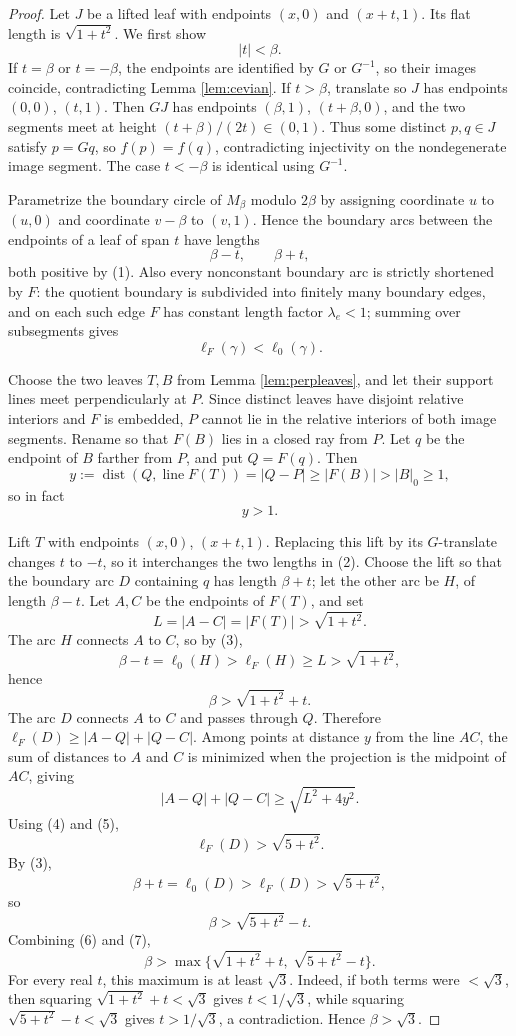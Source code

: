\documentclass[12pt]{article}
\theoremstyle{plain}
\begin{document}
\begin{proof}
Let \(J\) be a lifted leaf with endpoints \((x,0)\) and \((x+t,1)\).  Its flat
length is \(\sqrt{1+t^2}\).  We first show
\[
|t|<\beta. \tag{1}
\]
If \(t=\beta\) or \(t=-\beta\), the endpoints are identified by \(G\) or
\(G^{-1}\), so their images coincide, contradicting Lemma \ref{lem:cevian}.  If
\(t>\beta\), translate so \(J\) has endpoints \((0,0)\), \((t,1)\).  Then
\(GJ\) has endpoints \((\beta,1)\), \((t+\beta,0)\), and the two segments meet
at height \((t+\beta)/(2t)\in(0,1)\).  Thus some distinct \(p,q\in J\) satisfy
\(p=Gq\), so \(f(p)=f(q)\), contradicting injectivity on the nondegenerate
image segment.  The case \(t<-\beta\) is identical using \(G^{-1}\).

Parametrize the boundary circle of \(M_\beta\) modulo \(2\beta\) by assigning
coordinate \(u\) to \((u,0)\) and coordinate \(v-\beta\) to \((v,1)\).  Hence
the boundary arcs between the endpoints of a leaf of span \(t\) have lengths
\[
\beta-t,\qquad \beta+t, \tag{2}
\]
both positive by (1).  Also every nonconstant boundary arc is strictly
shortened by \(F\): the quotient boundary is subdivided into finitely many
boundary edges, and on each such edge \(F\) has constant length factor
\(\lambda_e<1\); summing over subsegments gives
\[
\ell_F(\gamma)<\ell_0(\gamma). \tag{3}
\]

Choose the two leaves \(T,B\) from Lemma \ref{lem:perpleaves}, and let their
support lines meet perpendicularly at \(P\).  Since distinct leaves have
disjoint relative interiors and \(F\) is embedded, \(P\) cannot lie in the
relative interiors of both image segments.  Rename so that \(F(B)\) lies in a
closed ray from \(P\).  Let \(q\) be the endpoint of \(B\) farther from \(P\),
and put \(Q=F(q)\).  Then
\[
y:=\operatorname{dist}(Q,\operatorname{line}F(T))=|Q-P|\ge |F(B)|>|B|_0\ge1,
\]
so in fact
\[
y>1. \tag{4}
\]

Lift \(T\) with endpoints \((x,0)\), \((x+t,1)\).  Replacing this lift by its
\(G\)-translate changes \(t\) to \(-t\), so it interchanges the two lengths in
(2).  Choose the lift so that the boundary arc \(D\) containing \(q\) has
length \(\beta+t\); let the other arc be \(H\), of length \(\beta-t\).  Let
\(A,C\) be the endpoints of \(F(T)\), and set
\[
L=|A-C|=|F(T)|>\sqrt{1+t^2}. \tag{5}
\]
The arc \(H\) connects \(A\) to \(C\), so by (3),
\[
\beta-t=\ell_0(H)>\ell_F(H)\ge L>\sqrt{1+t^2},
\]
hence
\[
\beta>\sqrt{1+t^2}+t. \tag{6}
\]
The arc \(D\) connects \(A\) to \(C\) and passes through \(Q\).  Therefore
\(\ell_F(D)\ge |A-Q|+|Q-C|\).  Among points at distance \(y\) from the line
\(AC\), the sum of distances to \(A\) and \(C\) is minimized when the
projection is the midpoint of \(AC\), giving
\[
|A-Q|+|Q-C|\ge \sqrt{L^2+4y^2}.
\]
Using (4) and (5),
\[
\ell_F(D)>\sqrt{5+t^2}.
\]
By (3),
\[
\beta+t=\ell_0(D)>\ell_F(D)>\sqrt{5+t^2},
\]
so
\[
\beta>\sqrt{5+t^2}-t. \tag{7}
\]
Combining (6) and (7),
\[
\beta>
\max\{\sqrt{1+t^2}+t,\ \sqrt{5+t^2}-t\}.
\]
For every real \(t\), this maximum is at least \(\sqrt3\).  Indeed, if both
terms were \(<\sqrt3\), then squaring
\(\sqrt{1+t^2}+t<\sqrt3\) gives \(t<1/\sqrt3\), while squaring
\(\sqrt{5+t^2}-t<\sqrt3\) gives \(t>1/\sqrt3\), a contradiction.  Hence
\(\beta>\sqrt3\).
\end{proof}
\end{document}
